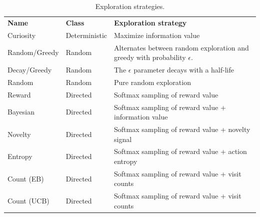 \begin{table}[]
	\caption{Exploration strategies.}
	\label{tab:agents}
	\begin{tabular}{p{2cm}p{2cm}p{3cm}}
	\textbf{Name} & \textbf{Class} & \textbf{Exploration strategy} \\ 
	Curiosity & Deterministic & Maximize information value \\ 
	Random/Greedy & Random & Alternates between random exploration and greedy with probability $\epsilon$. \\ 
	Decay/Greedy & Random & The $\epsilon$ parameter decays with a half-life \\ 
	Random & Random & Pure random exploration \\ 
	Reward & Directed & Softmax sampling of reward value \\ 
	Bayesian & Directed & Softmax sampling of reward value + information value \\ 
	Novelty & Directed & Softmax sampling of reward value + novelty signal \\ 
	Entropy & Directed & Softmax sampling of reward value + action entropy \\ 
	Count (EB) & Directed & Softmax sampling of reward value + visit counts \\ 
	Count (UCB) & Directed & Softmax sampling of reward value + visit counts \\ 
	\end{tabular}
\end{table}

